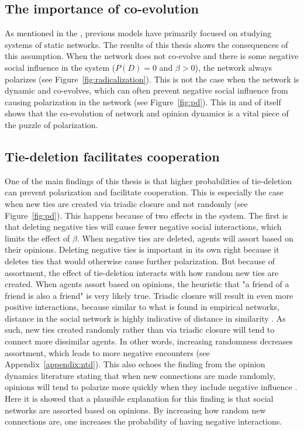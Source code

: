 \documentclass[11pt]{article}
\begin{document}
\subsection{The importance of co-evolution}
As mentioned in the \textit{}, previous models have primarily focused on studying systems of static networks.
The results of this thesis shows the consequences of this assumption. When the network does not co-evolve and there is some negative social influence in the system ($P(D) = 0$ and $\beta > 0$), the network always polarizes (see Figure~\ref{fig:radicalization}).
This is not the case when the network is dynamic and co-evolves, which can often prevent negative social influence from causing polarization in the network (see Figure~\ref{fig:pd}).
This in and of itself shows that the co-evolution of network and opinion dynamics is a vital piece of the puzzle of polarization. 

\subsection{Tie-deletion facilitates cooperation}

One of the main findings of this thesis is that higher probabilities of tie-deletion can prevent polarization and facilitate cooperation. This is especially the case when new ties are created via triadic closure and not randomly (see Figure~\ref{fig:pd}). This happens because of two effects in the system. The first is that deleting negative ties will cause fewer negative social interactions, which limits the effect of $\beta$. When negative ties are deleted, agents will assort based on their opinions. 
Deleting negative ties is important in its own right because it deletes ties that would otherwise cause further polarization. But because of assortment, the effect of tie-deletion interacts with how random new ties are created. When agents assort based on opinions, the heuristic that "a friend of a friend is also a friend" is very likely true. Triadic closure will result in even more positive interactions, because similar to what is found in empirical networks, distance in the social network is highly indicative of distance in similarity \cite{kossinets_origins_2009}. As such, new ties created randomly rather than via triadic closure will tend to connect more dissimilar agents. In other words, increasing randomness decreases assortment, which leads to more negative encounters (see Appendix~\ref{appendix:ntd}). This also echoes the finding from the opinion dynamics literature stating that when new connections are made randomly, opinions will tend to polarize more quickly when they include negative influence \cite{flache_why_2006,flache_small_2011,turner_paths_2018}. Here it is showed that a plausible explanation for this finding is that social networks are assorted based on opinions. By increasing how random new connections are, one increases the probability of having negative interactions. 
\end{document}
